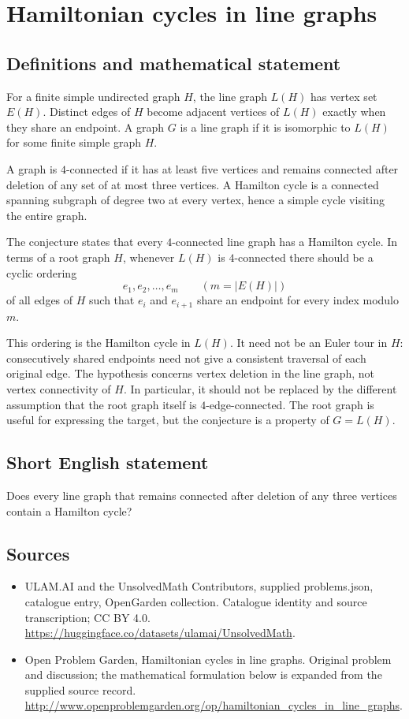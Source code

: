 \documentclass[11pt,a4paper]{article}
\begin{document}
\section*{Hamiltonian cycles in line graphs}\label{statement}

\subsection{Definitions and mathematical statement}
For a finite simple undirected graph $H$, the line graph
$L(H)$ has vertex set $E(H)$. Distinct edges of $H$ become
adjacent vertices of $L(H)$ exactly when they share an
endpoint. A graph $G$ is a line graph if it is isomorphic
to $L(H)$ for some finite simple graph $H$.

A graph is $4$-connected if it has at least five vertices
and remains connected after deletion of any set of at most
three vertices. A Hamilton cycle is a connected spanning
subgraph of degree two at every vertex, hence a simple
cycle visiting the entire graph.

The conjecture states that every $4$-connected line graph
has a Hamilton cycle. In terms of a root graph $H$, whenever
$L(H)$ is $4$-connected there should be a cyclic ordering
\[
 e_1,e_2,\ldots,e_m\qquad(m=|E(H)|)
\]
of all edges of $H$ such that $e_i$ and $e_{i+1}$ share
an endpoint for every index modulo $m$.

This ordering is the Hamilton cycle in $L(H)$. It need
not be an Euler tour in $H$: consecutively shared endpoints
need not give a consistent traversal of each original edge.
The hypothesis concerns vertex deletion in the line graph,
not vertex connectivity of $H$. In particular, it should
not be replaced by the different assumption that the root
graph itself is $4$-edge-connected. The root graph is useful
for expressing the target, but the conjecture is a property
of $G=L(H)$.
\subsection{Short English statement}
Does every line graph that remains connected after deletion of any three vertices contain a Hamilton cycle?
\subsection{Sources}
\begin{itemize}
\item[S1] ULAM.AI and the UnsolvedMath Contributors, supplied problems.json, catalogue entry, OpenGarden collection. Catalogue identity and source transcription; CC BY 4.0.
\url{https://huggingface.co/datasets/ulamai/UnsolvedMath}.
\item[S2] Open Problem Garden, Hamiltonian cycles in line graphs. Original problem and discussion; the mathematical formulation below is expanded from the supplied source record.
\url{http://www.openproblemgarden.org/op/hamiltonian_cycles_in_line_graphs}.
\end{itemize}
\end{document}
